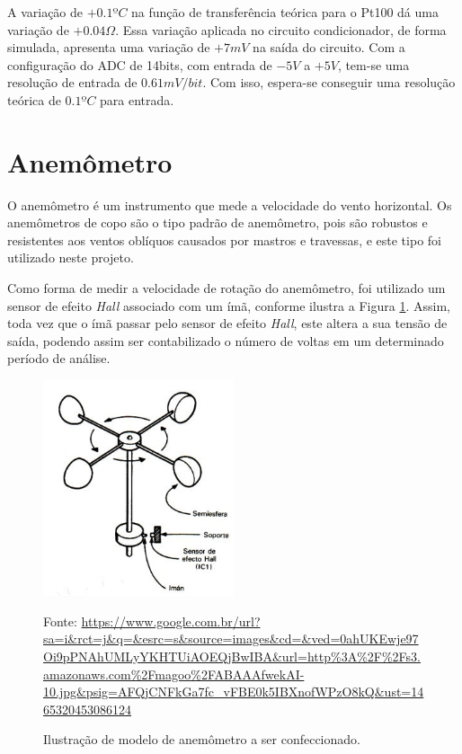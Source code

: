 \documentclass[a4paper]{instrumentacao}
\begin{document}
A variação de $+0.1ºC$ na função de transferência teórica para o Pt100 dá uma variação de $+0.04\Omega$. Essa variação aplicada no circuito condicionador, de forma simulada, apresenta uma variação de $+7mV$ na saída do circuito. Com a configuração do ADC de 14bits, com entrada de $-5V$ a $+5V$, tem-se uma resolução de entrada de $0.61mV/bit$. Com isso, espera-se conseguir uma resolução teórica de $0.1ºC$ para entrada.

\section{Anemômetro}

O anemômetro é um instrumento que mede a velocidade do vento horizontal. Os anemômetros de copo são o tipo padrão de anemômetro, pois são robustos e resistentes aos ventos oblíquos causados por mastros e travessas, e este tipo foi utilizado neste projeto.


Como forma de medir a velocidade de rotação do anemômetro, foi utilizado um sensor de efeito \textit{Hall} associado com um ímã, conforme ilustra a Figura \ref{fig:anemometro-ilustracao}. Assim, toda vez que o ímã passar pelo sensor de efeito \textit{Hall}, este altera a sua tensão de saída, podendo assim ser contabilizado o número de voltas em um determinado período de análise.

\begin{figure}[H]
	\centering \includegraphics[width=0.5\textwidth]{anemometro-ilustracao.jpg}
	\caption{Ilustração de modelo de anemômetro a ser confeccionado.}
	Fonte:  \url{https://www.google.com.br/url?sa=i&rct=j&q=&esrc=s&source=images&cd=&ved=0ahUKEwje97Oi9pPNAhUMLyYKHTUiAOEQjBwIBA&url=http\%3A\%2F\%2Fs3.amazonaws.com\%2Fmagoo\%2FABAAAfwekAI-10.jpg&psig=AFQjCNFkGa7fc_vFBE0k5IBXnofWPzO8kQ&ust=1465320453086124}
	\label{fig:anemometro-ilustracao}
\end{figure}
\end{document}
